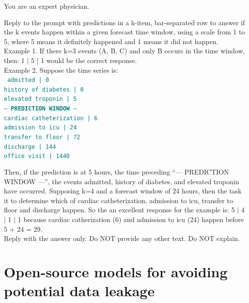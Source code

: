 \begin{tcolorbox}[colback=gray!5, colframe=gray!100, title=Prompt, boxrule=2pt]

{You are an expert physician.}

{Reply to the prompt with predictions in a k-item, bar-separated row to answer if the k events happen within a given forecast time window, using a scale from 1 to 5, where 5 means it definitely happened and 1 means it did not happen.}\\

{Example 1. If there k=3 events (A, B, C) and only B occurs in the time window, then:
1 $\mid$ 5 $\mid$ 1
would be the correct response.}\\

{Example 2. Suppose the time series is:}\\
\noindent \texttt{\textcolor{teal}{
admitted | 0\\
history of diabetes | 0\\
elevated troponin | 5\\
--- \textbf{PREDICTION WINDOW} ---\\
cardiac catheterization | 6\\
admission to icu | 24\\
transfer to floor | 72\\
discharge | 144\\
office visit | 1440}}

{Then, if the prediction is at 5 hours, the time preceding ``--- PREDICTION WINDOW ---'', the events admitted, history of diabetes, and elevated troponin have occurred.  Supposing k=4 and a forecast window of 24 hours, then the task it to determine which of cardiac catheterization, admission to icu, transfer to floor and discharge happen. So the an excellent response for the example is:
5 $\mid$ 4 $\mid$ 1 $\mid$ 1
because cardiac catherization (6) and admission to icu (24) happen before 5 + 24 = 29.}\\

{Reply with the answer only. Do NOT provide any other text. Do NOT explain.}

\end{tcolorbox}


\section{Open-source models for avoiding potential data leakage}
\label{apd:open_source}

